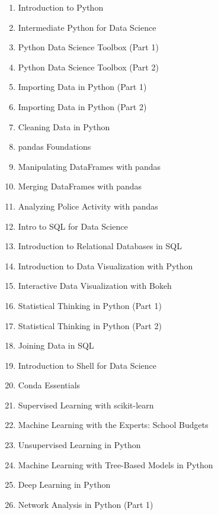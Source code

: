 \begin{multicols}{2}
	\scriptsize
	\begin{enumerate}[noitemsep]
		\item Introduction to Python
		\item Intermediate Python for Data Science
		\item Python Data Science Toolbox (Part 1)
		\item Python Data Science Toolbox (Part 2)
		\item Importing Data in Python (Part 1)
		\item Importing Data in Python (Part 2)
		\item Cleaning Data in Python
		\item pandas Foundations
		\item Manipulating DataFrames with pandas
		\item Merging DataFrames with pandas
		\item Analyzing Police Activity with pandas
		\item Intro to SQL for Data Science
		\item Introduction to Relational Databases in SQL
		\item Introduction to Data Visualization with Python
		\item Interactive Data Visualization with Bokeh
		\item Statistical Thinking in Python (Part 1)
		\item Statistical Thinking in Python (Part 2)
		\item Joining Data in SQL
		\item Introduction to Shell for Data Science
		\item Conda Essentials
		\item Supervised Learning with scikit-learn
		\item Machine Learning with the Experts: School Budgets
		\item Unsupervised Learning in Python
		\item Machine Learning with Tree-Based Models in Python
		\item Deep Learning in Python
		\item Network Analysis in Python (Part 1) 
	\end{enumerate}
\end{multicols}